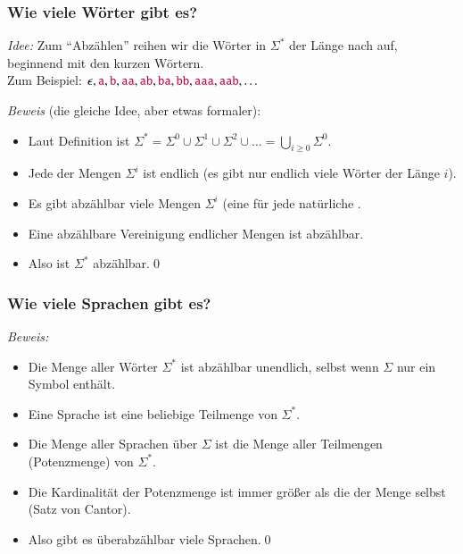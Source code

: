 \documentclass[onlymath]{beamer}
\begin{document}
\begin{frame}\frametitle{Wie viele Wörter gibt es?}

\pause

\pause

\emph{Idee:} Zum "`Abzählen"' reihen wir die Wörter in $\Sigma^*$ der Länge nach auf, beginnend mit den kurzen Wörtern.\\
Zum Beispiel: $\epsilon, \mathtt{\textcolor{purple}{a}}, \mathtt{\textcolor{purple}{b}}, \mathtt{\textcolor{purple}{aa}}, \mathtt{\textcolor{purple}{ab}}, \mathtt{\textcolor{purple}{ba}}, \mathtt{\textcolor{purple}{bb}}, \mathtt{\textcolor{purple}{aaa}}, \mathtt{\textcolor{purple}{aab}},\ldots$
\smallskip
\pause

\emph{Beweis} (die gleiche Idee, aber etwas formaler):\\
\begin{itemize}
\item Laut Definition ist $\Sigma^* = \Sigma^0 \cup \Sigma^1 \cup \Sigma^2 \cup \ldots = \bigcup_{i\geq 0} \Sigma^0$.\\
\item Jede der Mengen $\Sigma^i$ ist endlich (es gibt nur endlich viele Wörter der Länge $i$).\\
\item Es gibt abzählbar viele Mengen $\Sigma^i$ (eine für jede natürliche .\\
\item Eine abzählbare Vereinigung endlicher Mengen ist abzählbar.\\
\item Also ist $\Sigma^*$ abzählbar.\qed
\end{itemize}


\end{frame}

\begin{frame}\frametitle{Wie viele Sprachen gibt es?}

\pause

\pause

\emph{Beweis:}
\begin{itemize}
\item Die Menge aller Wörter \alert{$\Sigma^*$ ist abzählbar unendlich}, selbst wenn $\Sigma$ nur ein Symbol enthält.
\item Eine Sprache ist eine beliebige Teilmenge von $\Sigma^*$.
\item Die Menge aller Sprachen über $\Sigma$ ist die Menge aller Teilmengen (\alert{Potenzmenge}) von $\Sigma^*$.
\item Die Kardinalität der Potenzmenge ist immer größer als die der Menge selbst (\alert{Satz von Cantor}).
\item Also gibt es überabzählbar viele Sprachen.\qed
\end{itemize}

\end{frame}
\end{document}
